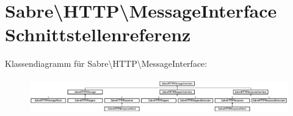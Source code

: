 \hypertarget{interface_sabre_1_1_h_t_t_p_1_1_message_interface}{}\section{Sabre\textbackslash{}H\+T\+TP\textbackslash{}Message\+Interface Schnittstellenreferenz}
\label{interface_sabre_1_1_h_t_t_p_1_1_message_interface}
Klassendiagramm für Sabre\textbackslash{}H\+T\+TP\textbackslash{}Message\+Interface\+:\begin{figure}[H]
\begin{center}
\leavevmode
\includegraphics[height=1.560976cm]{interface_sabre_1_1_h_t_t_p_1_1_message_interface}
\end{center}
\end{figure}
